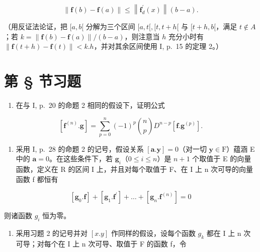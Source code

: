 \[
\left\| \mathbf {f} (b) - \mathbf {f} (a) \right\| \leqslant \left\| \mathbf {f} _ {d} ^ {\prime} (x) \right\| (b - a).
\]

（用反证法论证，把 \([a, b[\) 分解为三个区间 \([a, t[, [t, t + h[\) 与 \([t + h, b[\)，满足 \(t \notin A\)；若 \(k = \| \mathbf{f}(b) - \mathbf{f}(a)\| / (b - a)\)，则注意当 \(h\) 充分小时有 \(\| \mathbf{f}(t + h) - \mathbf{f}(t)\| < k.h\)，并对其余区间使用 I, p.~15 的定理 2。）

\setcounter{exercisegroup}{2}
\section*{第 \S{} 节习题}
{}

\begin{enumerate}
\def\labelenumi{\arabic{enumi})}
\tightlist
\item
  在与 I, p.~20 的命题 2 相同的假设下，证明公式
\end{enumerate}

\[
[ \mathbf {f} ^ {(n)}. \mathbf {g} ] = \sum_ {p = 0} ^ {n} (- 1) ^ {p} \binom {n} {p} D ^ {n - p} [ \mathbf {f}. \mathbf {g} ^ {(p)} ].
\]

\begin{enumerate}
\def\labelenumi{\arabic{enumi})}
\setcounter{enumi}{1}
\tightlist
\item
  采用 I, p.~28 的命题 2 的记号，假设关系 \([\mathbf{a}.\mathbf{y}] = 0\)（对一切 \(\mathbf{y} \in \mathrm{F}\)）蕴涵 E 中的 \(\mathbf{a} = 0\)。在这些条件下，若 \(\mathbf{g}_i\)（\(0 \leqslant i \leqslant n\)）是 \(n + 1\) 个取值于 E 的向量函数，定义在 R 的区间 I 上，并且对每个取值于 F、在 I 上 n 次可导的向量函数 f 都恒有
\end{enumerate}

\[
[ \mathbf {g} _ {0}. \mathbf {f} ] + [ \mathbf {g} _ {1}. \mathbf {f} ^ {\prime} ] + \dots + [ \mathbf {g} _ {n}. \mathbf {f} ^ {(n)} ] = 0
\]

则诸函数 \(g_{i}\) 恒为零。

\begin{enumerate}
\def\labelenumi{\arabic{enumi})}
\setcounter{enumi}{2}
\tightlist
\item
  采用习题 2 的记号并对 \([x.y]\) 作同样的假设，设每个函数 \(g_{k}\) 都在 I 上 n 次可导；对每个在 I 上 n 次可导、取值于 F 的函数 f，令
\end{enumerate}

